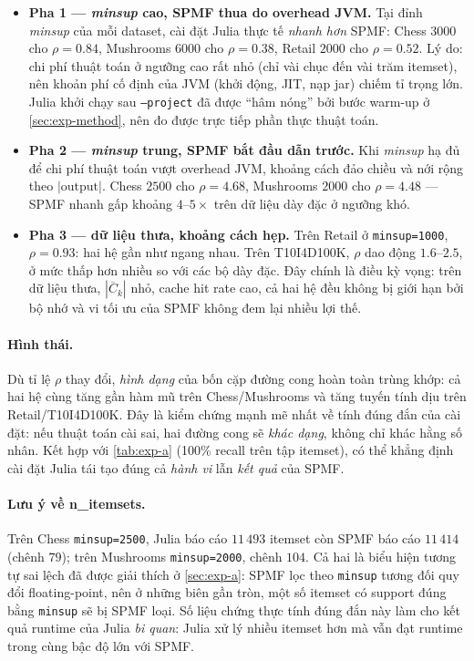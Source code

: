 \begin{itemize}
    \item \textbf{Pha 1 --- \textit{minsup} cao, SPMF thua do overhead JVM.} Tại đỉnh \textit{minsup} của mỗi dataset, cài đặt Julia thực tế \emph{nhanh hơn} SPMF: Chess $3000$ cho $\rho=0.84$, Mushrooms $6000$ cho $\rho=0.38$, Retail $2000$ cho $\rho=0.52$. Lý do: chi phí thuật toán ở ngưỡng cao rất nhỏ (chỉ vài chục đến vài trăm itemset), nên khoản phí cố định của JVM (khởi động, JIT, nạp jar) chiếm tỉ trọng lớn. Julia khởi chạy sau \texttt{--project} đã được ``hâm nóng'' bởi bước warm-up ở \autoref{sec:exp-method}, nên đo được trực tiếp phần thực thuật toán.
    \item \textbf{Pha 2 --- \textit{minsup} trung, SPMF bắt đầu dẫn trước.} Khi \textit{minsup} hạ đủ để chi phí thuật toán vượt overhead JVM, khoảng cách đảo chiều và nới rộng theo $|\text{output}|$. Chess $2500$ cho $\rho=4.68$, Mushrooms $2000$ cho $\rho=4.48$ --- SPMF nhanh gấp khoảng $4$--$5\times$ trên dữ liệu dày đặc ở ngưỡng khó.
    \item \textbf{Pha 3 --- dữ liệu thưa, khoảng cách hẹp.} Trên Retail ở \texttt{minsup=1000}, $\rho=0.93$: hai hệ gần như ngang nhau. Trên T10I4D100K, $\rho$ dao động $1.6$--$2.5$, ở mức thấp hơn nhiều so với các bộ dày đặc. Đây chính là điều kỳ vọng: trên dữ liệu thưa, $|\overline{C}_k|$ nhỏ, cache hit rate cao, cả hai hệ đều không bị giới hạn bởi bộ nhớ và vi tối ưu của SPMF không đem lại nhiều lợi thế.
\end{itemize}

\paragraph{Hình thái.} Dù tỉ lệ $\rho$ thay đổi, \emph{hình dạng} của bốn cặp đường cong hoàn toàn trùng khớp: cả hai hệ cùng tăng gần hàm mũ trên Chess/Mushrooms và tăng tuyến tính dịu trên Retail/T10I4D100K. Đây là kiểm chứng mạnh mẽ nhất về tính đúng đắn của cài đặt: nếu thuật toán cài sai, hai đường cong sẽ \emph{khác dạng}, không chỉ khác hằng số nhân. Kết hợp với \autoref{tab:exp-a} (100\% recall trên tập itemset), có thể khẳng định cài đặt Julia tái tạo đúng cả \emph{hành vi} lẫn \emph{kết quả} của SPMF.

\paragraph{Lưu ý về n\_itemsets.} Trên Chess \texttt{minsup=2500}, Julia báo cáo $11\,493$ itemset còn SPMF báo cáo $11\,414$ (chênh $79$); trên Mushrooms \texttt{minsup=2000}, chênh $104$. Cả hai là biểu hiện tương tự sai lệch đã được giải thích ở \autoref{sec:exp-a}: SPMF lọc theo \texttt{minsup} tương đối quy đổi floating-point, nên ở những biên gần tròn, một số itemset có support đúng bằng \texttt{minsup} sẽ bị SPMF loại. Số liệu chứng thực tính đúng đắn này làm cho kết quả runtime của Julia \emph{bi quan}: Julia xử lý nhiều itemset hơn mà vẫn đạt runtime trong cùng bậc độ lớn với SPMF.

